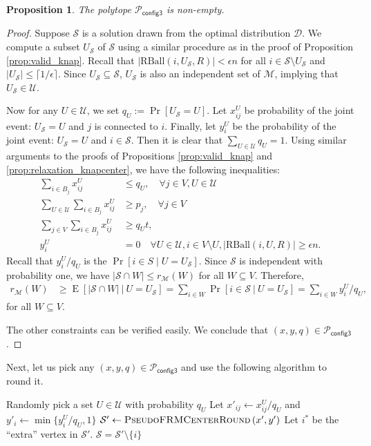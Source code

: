 \documentclass[a4paper,11pt]{article}
\newtheorem{proposition}[theorem]{Proposition}
\DeclareMathOperator*{\E}{\mathrm{E}}
\newcommand{\D}{\mathcal{D}}
\renewcommand{\S}{\mathcal{S}}
\newcommand{\U}{\mathcal{U}}
\newcommand{\M}{\mathcal{M}}
\renewcommand{\P}{\mathcal{P}}
\newcommand{\RBall}{\mathrm{RBall}}
\begin{document}
\begin{proposition} The polytope $\P_\textsf{config3}$ is non-empty.
\end{proposition}
\begin{proof}
Suppose $\S$ is a solution drawn from the optimal distribution $\D$. We compute a subset $U_\S$ of $\S$ using a similar procedure as in the proof of Proposition \ref{prop:valid_knap}. Recall that $ |\RBall(i, U_\S, R)| < \epsilon n$ for all $i \in \S \setminus U_\S$ and $|U_\S| \leq \lceil 1/\epsilon \rceil$. Since $U_\S \subseteq \S$, $U_\S$ is also an independent set of $\M$, implying that $U_\S \in \U$.



Now for any $U \in \U$, we set $q_U := \Pr[U_\S = U]$. Let $x^{U}_{ij}$ be probability of the joint event: $U_\S = U$ and $j$ is connected to $i$. Finally, let $y^{U}_i$ be the probability of the joint event: $U_\S = U$ and $i \in \S$. Then it is clear that $\sum_{U \in \U}q_U = 1$. Using similar arguments to the proofs of Propositions \ref{prop:valid_knap} and \ref{prop:relaxation_knapcenter}, we have the following inequalities:
\begin{align}
\sum_{i \in B_j} x^{U}_{ij} &\leq q_U,     \quad \forall j \in V, U \in \U \\
      \sum_{U \in \U} \sum_{i \in B_j} x^{U}_{ij} &\geq p_j,     \quad \forall j \in V \\
      \sum_{j \in V} \sum_{i \in B_j} x^{U}_{ij} &\geq q_U t,    \quad \\
        y^{U}_i &=  0  \quad \forall U \in \U, i \in V \setminus U, |\RBall(i, U, R)| \geq \epsilon n.
\end{align}
Recall that $y^U_i/q_U$ is the $\Pr[ i \in S \mid U = U_\S]$. Since $\S$ is independent with probability one, we have $  |\S \cap W | \leq r_\M(W)$ for all $W \subseteq V$. Therefore,
\begin{align*}
	r_\M(W) &\geq \E[|\S \cap W | ~|~ U = U_\S] = \sum_{i \in W}\Pr[i \in \S ~|~ U = U_\S] = \sum_{i \in W}y^U_i/q_U,
\end{align*}
for all $W \subseteq V$.

The other constraints can be verified easily. We conclude that $(x,y,q) \in \P_\textsf{config3}$.
\end{proof}


Next, let us pick any $(x,y,q) \in \P_\textsf{config3}$ and use the following algorithm to round it. 

\begin{algorithm}[h]
\caption{$\textsc{FRMCenterRound}\left(x,y,q \right)$}
\begin{algorithmic}[1]
\STATE Randomly pick a set $U \in \U$ with probability $q_U$
\STATE Let $x'_{ij} \gets x^{U}_{ij}/q_U$ and $y'_i \gets \min\{y_i^U/q_U, 1\}$
\STATE $\S' \gets \textsc{PseudoFRMCenterRound}\left(x', y' \right)$
\STATE Let $i^*$ be the ``extra'' vertex in $\S'$.
\RETURN $\S = \S' \setminus \{i\}$
\end{algorithmic} 
\label{algo:rfknapcenter}
\end{algorithm}
\end{document}

